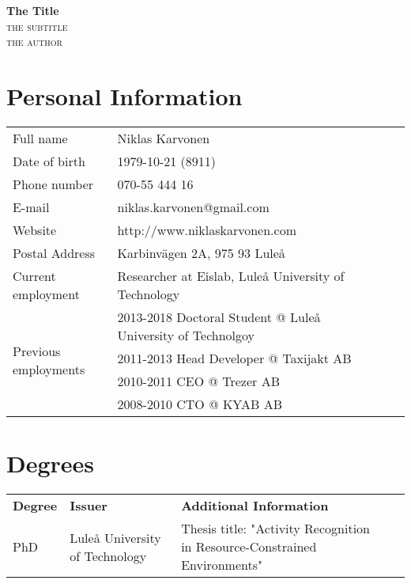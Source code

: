 \documentclass{memoir}
\makeatletter
\newlength\drop
\newcommand*\titleM{\begingroup%
\setlength\drop{0.08\textheight}
\centering
\vspace*{\drop}
{\Huge\bfseries The Title}\\[\baselineskip]
{\scshape the subtitle}\\[\baselineskip]
\vfill
{\large\scshape the author}\par
\vfill
{\scshape \@date}\par
\vspace*{2\drop}
\endgroup}
\makeatother
\begin{document}
\begin{titlingpage}
\titleM
\end{titlingpage}

\tableofcontents
\newpage

\section{Personal Information}

\begin{table}[ht]
\begin{tabular}[t]{lllll}
Full name & Niklas Karvonen  \\
Date of birth & 1979-10-21 (8911) \\
Phone number & 070-55 444 16 \\ 
E-mail & niklas.karvonen@gmail.com \\
Website & http://www.niklaskarvonen.com \\
Postal Address & Karbinvägen 2A, 975 93 Luleå \\
Current employment & Researcher at Eislab, Luleå University of Technology \\
\multirow[t]{4}{*}{Previous employments}
& 2013-2018 Doctoral Student @ Luleå University of Technolgoy \\
& 2011-2013 Head Developer @ Taxijakt AB \\
& 2010-2011 CEO @ Trezer AB \\
& 2008-2010 CTO @ KYAB AB \\
\end{tabular}
\end{table}
\newpage

\section{Degrees}
\begin{table}[ht]
\begin{tabular}[t]{lllll}
\textbf{Degree} & \textbf{Issuer} & \textbf{Additional Information}\\
PhD & Luleå University of Technology & Thesis title: "Activity Recognition in Resource-Constrained Environments"\\

\end{tabular}
\end{table}
\end{document}
